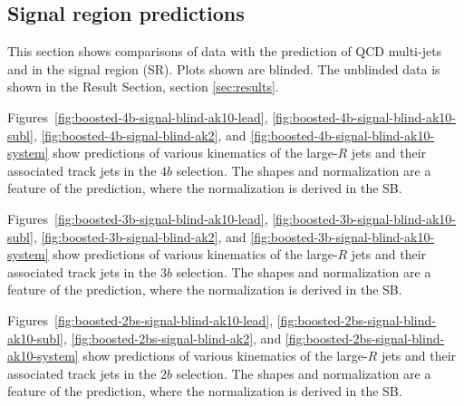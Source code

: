 \clearpage




\subsection{Signal region predictions}
\label{sec:boosted-SR}This section shows comparisons of data with the prediction of QCD multi-jets and \ttbar in the signal region (SR). Plots shown are blinded. The unblinded data is shown in the Result Section, section \ref{sec:results}.

Figures~\ref{fig:boosted-4b-signal-blind-ak10-lead}, \ref{fig:boosted-4b-signal-blind-ak10-subl}, \ref{fig:boosted-4b-signal-blind-ak2}, and \ref{fig:boosted-4b-signal-blind-ak10-system} show predictions of various kinematics of the large-$R$ jets and their associated track jets in the $4b$ selection. The shapes and normalization are a feature of the prediction, where the normalization is derived in the SB. %

Figures~\ref{fig:boosted-3b-signal-blind-ak10-lead}, \ref{fig:boosted-3b-signal-blind-ak10-subl}, \ref{fig:boosted-3b-signal-blind-ak2}, and \ref{fig:boosted-3b-signal-blind-ak10-system} show predictions of various kinematics of the large-$R$ jets and their associated track jets in the $3b$ selection. The shapes and normalization are a feature of the prediction, where the normalization is derived in the SB. %

Figures~\ref{fig:boosted-2bs-signal-blind-ak10-lead}, \ref{fig:boosted-2bs-signal-blind-ak10-subl}, \ref{fig:boosted-2bs-signal-blind-ak2}, and \ref{fig:boosted-2bs-signal-blind-ak10-system} show predictions of various kinematics of the large-$R$ jets and their associated track jets in the $2b$ selection. The shapes and normalization are a feature of the prediction, where the normalization is derived in the SB. %

